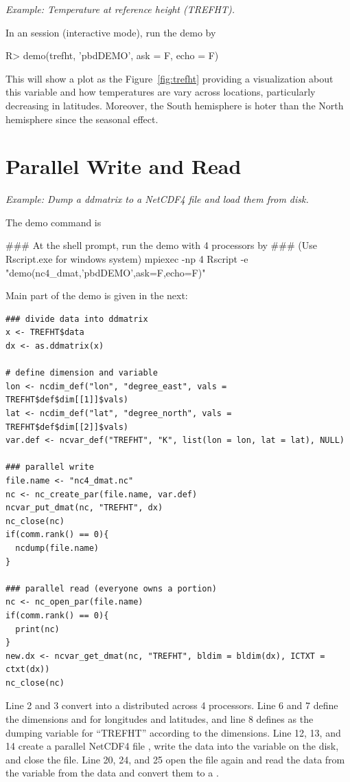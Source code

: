 \emph{Example: Temperature at reference height (TREFHT).}

In an  session (interactive mode), run the demo by
\begin{Code}[title=R Code]
R> demo(trefht, 'pbdDEMO', ask = F, echo = F)
\end{Code}
This will show a plot as the Figure~\ref{fig:trefht} providing a
visualization about this variable and how temperatures are vary
across locations, particularly decreasing in latitudes. Moreover, the
South hemisphere is hoter than the North hemisphere since the seasonal
effect.



\section{Parallel Write and Read}

\emph{Example: Dump a ddmatrix to a NetCDF4 file and load them from disk.}

The demo command is
\begin{Command}
### At the shell prompt, run the demo with 4 processors by
### (Use Rscript.exe for windows system)
mpiexec -np 4 Rscript -e "demo(nc4_dmat,'pbdDEMO',ask=F,echo=F)"
\end{Command}

Main part of the demo is given in the next:
\begin{lstlisting}[language=rr,title=nc4\_dmat]
### divide data into ddmatrix
x <- TREFHT$data
dx <- as.ddmatrix(x)

# define dimension and variable
lon <- ncdim_def("lon", "degree_east", vals = TREFHT$def$dim[[1]]$vals)
lat <- ncdim_def("lat", "degree_north", vals = TREFHT$def$dim[[2]]$vals)
var.def <- ncvar_def("TREFHT", "K", list(lon = lon, lat = lat), NULL)

### parallel write
file.name <- "nc4_dmat.nc"
nc <- nc_create_par(file.name, var.def)
ncvar_put_dmat(nc, "TREFHT", dx)
nc_close(nc)
if(comm.rank() == 0){
  ncdump(file.name)
}

### parallel read (everyone owns a portion)
nc <- nc_open_par(file.name)
if(comm.rank() == 0){
  print(nc)
}
new.dx <- ncvar_get_dmat(nc, "TREFHT", bldim = bldim(dx), ICTXT = ctxt(dx))
nc_close(nc)
\end{lstlisting}

Line 2 and 3 convert  into a  distributed
across 4 processors. Line 6 and 7 define the dimensions
 and  for longitudes and latitudes, and line 8
defines  as the dumping variable for ``TREFHT'' according
to the dimensions.
 Line 12, 13, and 14 create a parallel NetCDF4 file
,
write the data into the variable on the disk, and close the file.
Line 20, 24, and 25 open the file again and read the data from the
variable from the data and convert them to a .

